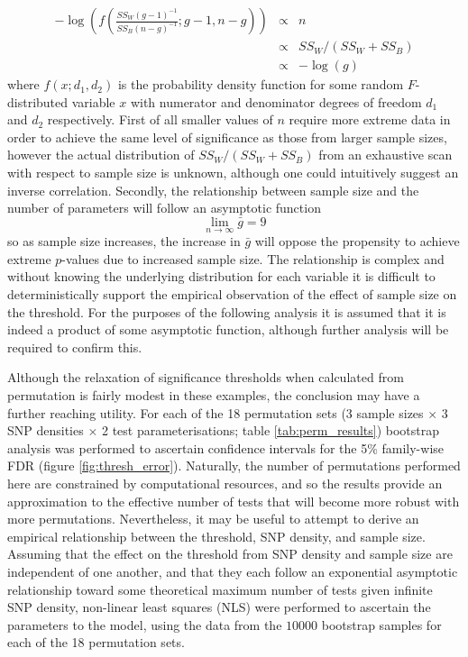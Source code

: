 \begin{eqnarray}
-\log \left ( f \left (
\frac{
 SS_{W}  (g - 1)^{-1}
}
{  SS_{B} (n - g)^{-1}
}; g - 1, n - g
\right ) \right )
& \propto &
 n \\
& \propto &
SS_{W} / (SS_{W} + SS_{B}) \\
& \propto &
-\log(g)
\label{eq:ftest_n}
\end{eqnarray}
where $f(x; d_{1}, d_{2})$ is the probability density function for some random $F$-distributed variable $x$ with numerator and denominator degrees of freedom $d_{1}$ and $d_{2}$ respectively. First of all smaller values of $n$ require more extreme data in order to achieve the same level of significance as those from larger sample sizes, however the actual distribution of $SS_{W} / (SS_{W} + SS_{B})$ from an exhaustive scan with respect to sample size is unknown, although one could intuitively suggest an inverse correlation. Secondly, the relationship between sample size and the number of parameters will follow an asymptotic function 
\begin{equation}
\lim_{n \to \infty} \bar{g} = 9
\end{equation}
so as sample size increases, the increase in $\bar{g}$ will oppose the propensity to achieve extreme $p$-values due to increased sample size. The relationship is complex and without knowing the underlying distribution for each variable it is difficult to deterministically support the empirical observation of the effect of sample size on the threshold. For the purposes of the following analysis it is assumed that it is indeed a product of some asymptotic function, although further analysis will be required to confirm this.

Although the relaxation of significance thresholds when calculated from permutation is fairly modest in these examples, the conclusion may have a further reaching utility. For each of the 18 permutation sets (3 sample sizes $\times$ 3 SNP densities $\times$ 2 test parameterisations; table \ref{tab:perm_results}) bootstrap analysis was performed to ascertain confidence intervals for the 5\% family-wise FDR (figure \ref{fig:thresh_error}). Naturally, the number of permutations performed here are constrained by computational resources, and so the results provide an approximation to the effective number of tests that will become more robust with more permutations. Nevertheless, it may be useful to attempt to derive an empirical relationship between the threshold, SNP density, and sample size. Assuming that the effect on the threshold from SNP density and sample size are independent of one another, and that they each follow an exponential asymptotic relationship toward some theoretical maximum number of tests given infinite SNP density, non-linear least squares (NLS) were performed to ascertain the parameters to the model, using the data from the $10000$ bootstrap samples for each of the 18 permutation sets.


